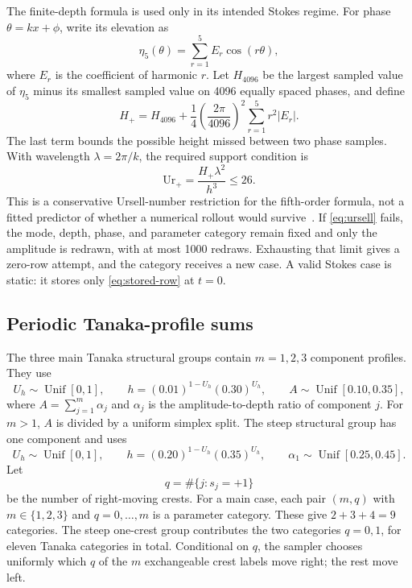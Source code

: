 \documentclass[10pt]{article}
\begin{document}
The finite-depth formula is used only in its intended Stokes regime.  For
phase $\theta=kx+\phi$, write its elevation as
\[
  \eta_5(\theta)=\sum_{r=1}^{5}E_r\cos(r\theta),
\]
where $E_r$ is the coefficient of harmonic $r$.  Let $H_{4096}$ be the
largest sampled value of $\eta_5$ minus its smallest sampled value on 4096
equally spaced phases, and define
\[
  H_+
  =
  H_{4096}
  +\frac14\left(\frac{2\pi}{4096}\right)^2
    \sum_{r=1}^{5}r^2|E_r|.
\]
The last term bounds the possible height missed between two phase samples.
With wavelength $\lambda=2\pi/k$, the required support condition is
\begin{equation}
  \mathrm{Ur}_+
  =\frac{H_+\lambda^2}{h^3}
  \leq26.
  \label{eq:ursell}
\end{equation}
This is a conservative Ursell-number restriction for the fifth-order
formula, not a fitted predictor of whether a numerical rollout would
survive~\cite{fenton1985,zhao2024}.  If \eqref{eq:ursell} fails, the mode,
depth, phase, and parameter category remain fixed and only the amplitude is
redrawn, with at most 1000 redraws.  Exhausting that limit gives a zero-row
attempt, and the category receives a new case.  A valid Stokes case is static:
it stores only \eqref{eq:stored-row} at $t=0$.

\subsection{Periodic Tanaka-profile sums}

The three main Tanaka structural groups contain $m=1,2,3$ component profiles.
They use
\[
  U_h\sim\operatorname{Unif}[0,1],\qquad
  h=(0.01)^{1-U_h}(0.30)^{U_h},\qquad
  A\sim\operatorname{Unif}[0.10,0.35],
\]
where $A=\sum_{j=1}^{m}\alpha_j$ and
$\alpha_j$ is the amplitude-to-depth ratio of component $j$.  For $m>1$,
$A$ is divided by a uniform simplex split.  The steep structural group has one
component and uses
\[
  U_h\sim\operatorname{Unif}[0,1],\qquad
  h=(0.20)^{1-U_h}(0.35)^{U_h},\qquad
  \alpha_1\sim\operatorname{Unif}[0.25,0.45].
\]
Let
\[
  q=\#\{j:s_j=+1\}
\]
be the number of right-moving crests.  For a main case, each pair $(m,q)$
with $m\in\{1,2,3\}$ and $q=0,\ldots,m$ is a parameter category.  These give
$2+3+4=9$ categories.  The steep one-crest group contributes the two
categories $q=0,1$, for eleven Tanaka categories in total.  Conditional on
$q$, the sampler chooses uniformly which $q$ of the $m$ exchangeable crest
labels move right; the rest move left.
\end{document}
